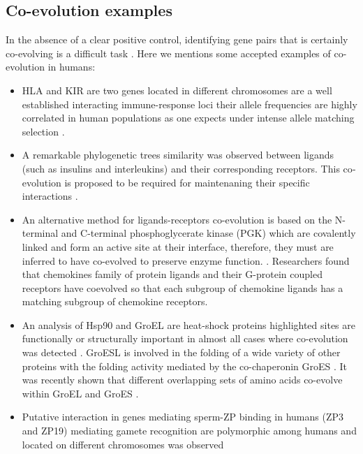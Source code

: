 \subsection{Co-evolution examples}

In the absence of a clear positive control, identifying gene pairs that is certainly co-evolving is a difficult task \cite{rohlfs2010detecting}.
Here we mentions some accepted examples of co-evolution in humans:

\begin{itemize}

\item HLA and KIR are two genes located in different chromosomes are a well established interacting immune-response loci their allele frequencies are highly correlated in human populations as one expects under intense allele matching selection \cite{rohlfs2010detecting:REF}.

\item A remarkable phylogenetic trees similarity was observed between ligands (such as insulins and interleukins) and their corresponding receptors.
This co‐evolution is proposed to be required for maintenaning their specific interactions \cite{de2013emerging:REF}.

\item An alternative method for ligands-receptors co-evolution is based on the N-terminal and C-terminal phosphoglycerate kinase (PGK) which are covalently linked and form an active site at their interface, therefore, they must are inferred to have co-evolved to preserve enzyme function. \cite{goh2000co}.
Researchers found that chemokines family of protein ligands and their G-protein coupled receptors have coevolved so that each subgroup of chemokine ligands has a matching subgroup of chemokine receptors. \cite{goh2000co}

\item An analysis of Hsp90 and GroEL are heat-shock proteins highlighted sites are functionally or structurally important in almost all cases where co-evolution was detected \cite{fares2006novel}.
GroESL is involved in the folding of a wide variety of other proteins with the folding activity mediated by the co-chaperonin GroES  \cite{ruiz2013coevolution}.
It was recently shown that different overlapping sets of amino acids co-evolve within GroEL and GroES \cite{ruiz2013coevolution}.

\item Putative interaction in genes mediating sperm-ZP binding in humans (ZP3 and ZP19) mediating gamete recognition are polymorphic among humans and located on different chromosomes was observed \cite{rohlfs2010detecting}


\end{itemize}
